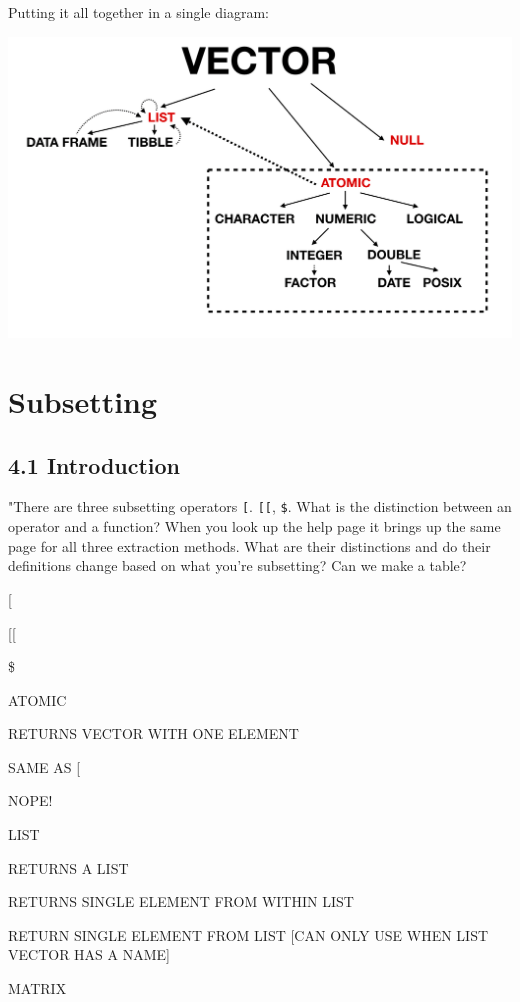 \documentclass[]{book}
\begin{document}
Putting it all together in a single diagram:

\includegraphics[width=26.44in]{images/vectors}

\hypertarget{subsetting}{%
\chapter{Subsetting}\label{subsetting}}

\hypertarget{introduction}{%
\section*{4.1 Introduction}\label{introduction}}

"There are three subsetting operators \texttt{{[}}. \texttt{{[}{[}}, \texttt{\$}. What is the distinction between an operator and a function? When you look up the help page it brings up the same page for all three extraction methods. What are their distinctions and do their definitions change based on what you're subsetting? Can we make a table?

{[}

{[}{[}

\$

ATOMIC

RETURNS VECTOR WITH ONE ELEMENT

SAME AS {[}

NOPE!

LIST

RETURNS A LIST

RETURNS SINGLE ELEMENT FROM WITHIN LIST

RETURN SINGLE ELEMENT FROM LIST {[}CAN ONLY USE WHEN LIST VECTOR HAS A NAME{]}

MATRIX
\end{document}
